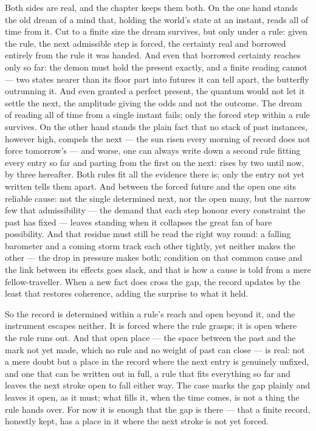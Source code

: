 Both sides are real, and the chapter keeps them both. On the one hand stands the old dream of a mind that,
holding the world's state at an instant, reads all of time from it. Cut to a finite size the dream survives, but
only under a rule: given the rule, the next admissible step is forced, the certainty real and borrowed entirely
from the rule it was handed. And even that borrowed certainty reaches only so far: the demon must hold the
present exactly, and a finite reading cannot --- two states nearer than its floor part into futures it can tell
apart, the butterfly outrunning it. And even granted a perfect present, the quantum would not let it settle the
next, the amplitude giving the odds and not the outcome. The dream of reading all of time from a single instant
fails; only the forced step within a rule survives. On the other hand stands the plain fact that no stack of past instances, however
high, compels the next --- the sun risen every morning of record does not force tomorrow's --- and worse, one
can always write down a second rule fitting every entry so far and parting from the first on the next: rises by
two until now, by three hereafter. Both rules fit all the evidence there is; only the entry not yet written
tells them apart. And between the forced future and the open one sits reliable cause: not the single determined
next, nor the open many, but the narrow few that admissibility --- the demand that each step honour every
constraint the past has fixed --- leaves standing when it collapses the great fan of bare possibility. And that residue must still be read the
right way round: a falling barometer and a coming storm track each other tightly, yet neither makes the other
--- the drop in pressure makes both; condition on that common cause and the link between its effects goes slack,
and that is how a cause is told from a mere fellow-traveller. When a new fact does cross the gap, the record updates by the least that restores coherence, adding the surprise to
what it held.

So the record is determined within a rule's reach and open beyond it, and the instrument escapes neither. It is
forced where the rule grasps; it is open where the rule runs out. And that open place --- the space between the
past and the mark not yet made, which no rule and no weight of past can close --- is real: not a mere doubt but
a place in the record where the next entry is genuinely unfixed, and one that can be written out in full, a rule
that fits everything so far and leaves the next stroke open to fall either way. The case marks the gap plainly
and leaves it open, as it must; what fills it, when the time comes, is not a thing the rule hands over. For now
it is enough that the gap is there --- that a finite record, honestly kept, has a place in it where the next
stroke is not yet forced.

